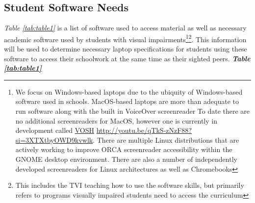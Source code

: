 \pagebreak\hypertarget{student-software-needs}{}\subsection{Student Software Needs}\label{student-software-needs}
\textit{Table \ref{tab:table1}} is a list of software used to access material as well as necessary academic software used by students with visual impairments\footnote{\raggedright We focus on Windows-based laptops due to the ubiquity of Windows-based software used in schools. MacOS-based laptops are more than adequate to run software along with the built in VoiceOver screenreader  To date there are no additional screenreaders for MacOS, however one is currently in development called \href{http://youtu.be/qTkS-zNzF88?si=3XTXtbyOWD9kvwlk}{VOSH} \url{http://youtu.be/qTkS-zNzF88?si=3XTXtbyOWD9kvwlk}. There are multiple Linux distributions that are actively working to improve ORCA screenreader accessibility within the GNOME desktop environment. There are also a number of independently developed screenreaders for Linux architectures as well as Chromebooks}\fnsep\footnote{\raggedright This includes the TVI teaching how to use the software skills, but primarily refers to programs visually impaired students need to access the curriculum}. This information will be used to determine necessary laptop specifications for students using these software to access their schoolwork at the same time as their sighted peers.
\pagebreak
\large\textbf{\textit{Table \ref{tab:table1}}}\normalfont
